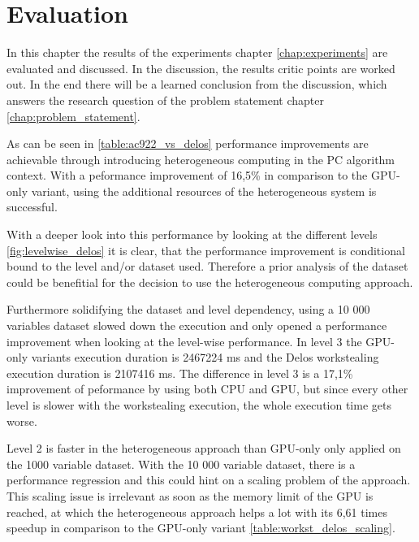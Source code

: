 \chapter{Evaluation}
In this chapter the results of the experiments chapter \ref{chap:experiments} are evaluated and discussed. In the discussion, the results critic points are worked out. In the end there will be a learned conclusion from the discussion, which answers the research question of the problem statement chapter \ref{chap:problem_statement}.

% 
As can be seen in \ref{table:ac922_vs_delos} performance improvements are achievable through introducing heterogeneous computing in the PC algorithm context. With a peformance improvement of 16,5\% in comparison to the GPU-only variant, using the additional resources of the heterogeneous system is successful.

With a deeper look into this performance by looking at the different levels \ref{fig:levelwise_delos} it is clear, that the performance improvement is conditional bound to the level and/or dataset used. Therefore a prior analysis of the dataset could be benefitial for the decision to use the heterogeneous computing approach.

Furthermore solidifying the dataset and level dependency, using a 10 000 variables dataset slowed down the execution and only opened a performance improvement when looking at the level-wise performance. In level 3 the GPU-only variants execution duration is 2467224 ms and the Delos workstealing execution duration is 2107416 ms.
The difference in level 3 is a 17,1\% improvement of peformance by using both CPU and GPU, but since every other level is slower with the workstealing execution, the whole execution time gets worse.

Level 2 is faster in the heterogeneous approach than GPU-only only applied on the 1000 variable dataset. With the 10 000 variable dataset, there is a performance regression and this could hint on a scaling problem of the approach.
This scaling issue is irrelevant as soon as the memory limit of the GPU is reached, at which the heterogeneous approach helps a lot with its 6,61 times speedup in comparison to the GPU-only variant \ref{table:workst_delos_scaling}.

% 
% 
% 
% 
% 
% 